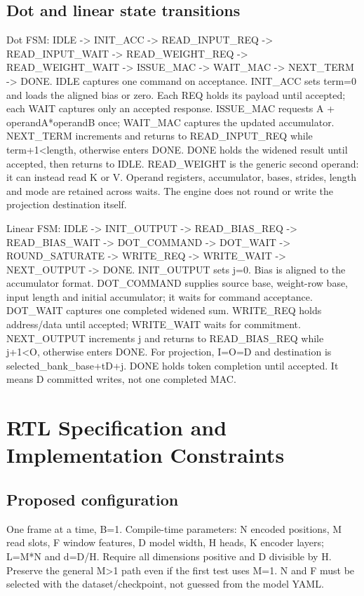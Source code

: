 \documentclass[11pt,a4paper]{article}
\begin{document}
\subsection{Dot and linear state transitions}
Dot FSM: IDLE -> INIT\_ACC -> READ\_INPUT\_REQ -> READ\_INPUT\_WAIT -> READ\_WEIGHT\_REQ -> READ\_WEIGHT\_WAIT -> ISSUE\_MAC -> WAIT\_MAC -> NEXT\_TERM -> DONE. IDLE captures one command on acceptance. INIT\_ACC sets term=0 and loads the aligned bias or zero. Each REQ holds its payload until accepted; each WAIT captures only an accepted response. ISSUE\_MAC requests A + operandA*operandB once; WAIT\_MAC captures the updated accumulator. NEXT\_TERM increments and returns to READ\_INPUT\_REQ while term+1<length, otherwise enters DONE. DONE holds the widened result until accepted, then returns to IDLE. READ\_WEIGHT is the generic second operand: it can instead read K or V. Operand registers, accumulator, bases, strides, length and mode are retained across waits. The engine does not round or write the projection destination itself.

Linear FSM: IDLE -> INIT\_OUTPUT -> READ\_BIAS\_REQ -> READ\_BIAS\_WAIT -> DOT\_COMMAND -> DOT\_WAIT -> ROUND\_SATURATE -> WRITE\_REQ -> WRITE\_WAIT -> NEXT\_OUTPUT -> DONE. INIT\_OUTPUT sets j=0. Bias is aligned to the accumulator format. DOT\_COMMAND supplies source base, weight-row base, input length and initial accumulator; it waits for command acceptance. DOT\_WAIT captures one completed widened sum. WRITE\_REQ holds address/data until accepted; WRITE\_WAIT waits for commitment. NEXT\_OUTPUT increments j and returns to READ\_BIAS\_REQ while j+1<O, otherwise enters DONE. For projection, I=O=D and destination is selected\_bank\_base+tD+j. DONE holds token completion until accepted. It means D committed writes, not one completed MAC.

\section{RTL Specification and Implementation Constraints}
\subsection{Proposed configuration}
One frame at a time, B=1. Compile-time parameters: N encoded positions, M read slots, F window features, D model width, H heads, K encoder layers; L=M*N and d=D/H. Require all dimensions positive and D divisible by H. Preserve the general M>1 path even if the first test uses M=1. N and F must be selected with the dataset/checkpoint, not guessed from the model YAML.
\end{document}
